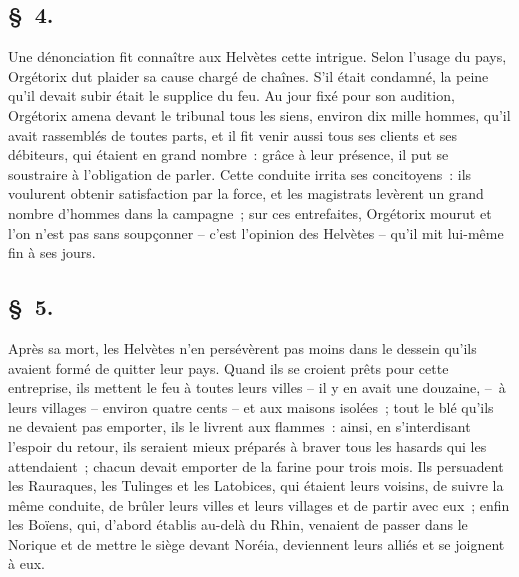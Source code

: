 \documentclass[french,twoside]{book} %
\begin{document}
\subsection[{§ 4.}]{ \textsc{§ 4.} }
\noindent Une dénonciation fit connaître aux Helvètes cette intrigue. Selon l’usage du pays, Orgétorix dut plaider sa cause chargé de chaînes. S'il était condamné, la peine qu’il devait subir était le supplice du feu. Au jour fixé pour son audition, Orgétorix amena devant le tribunal tous les siens, environ dix mille hommes, qu’il avait rassemblés de toutes parts, et il fit venir aussi tous ses clients et ses débiteurs, qui étaient en grand nombre : grâce à leur présence, il put se soustraire à l’obligation de parler. Cette conduite irrita ses concitoyens : ils voulurent obtenir satisfaction par la force, et les magistrats levèrent un grand nombre d’hommes dans la campagne ; sur ces entrefaites, Orgétorix mourut et l’on n’est pas sans soupçonner – c’est l’opinion des Helvètes – qu’il mit lui-même fin à ses jours.
\subsection[{§ 5.}]{ \textsc{§ 5.} }
\noindent Après sa mort, les Helvètes n’en persévèrent pas moins dans le dessein qu’ils avaient formé de quitter leur pays. Quand ils se croient prêts pour cette entreprise, ils mettent le feu à toutes leurs villes – il y en avait une douzaine, – à leurs villages – environ quatre cents – et aux maisons isolées ; tout le blé qu’ils ne devaient pas emporter, ils le livrent aux flammes : ainsi, en s’interdisant l’espoir du retour, ils seraient mieux préparés à braver tous les hasards qui les attendaient ; chacun devait emporter de la farine pour trois mois. Ils persuadent les Rauraques, les Tulinges et les Latobices, qui étaient leurs voisins, de suivre la même conduite, de brûler leurs villes et leurs villages et de partir avec eux ; enfin les Boïens, qui, d’abord établis au-delà du Rhin, venaient de passer dans le Norique et de mettre le siège devant Noréia, deviennent leurs alliés et se joignent à eux.
\end{document}
